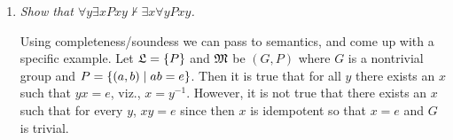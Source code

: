 \documentclass[10pt]{article}
\begin{document}
\begin{enumerate}
\begin{enumerate}
\item \emph{Show that $\forall y \exists x Pxy \not\vdash \exists x \forall y Pxy$.}

Using completeness/soundess we can pass to semantics, and come up with a specific example.  Let $\mathfrak{L}=\left\{ P \right\}$ and $\mathfrak{M}$ be $(G, P)$ where $G$ is a nontrivial group and $P = \left\{ (a,b) \mid ab = e \right\}$.  Then it is true that for all $y$ there exists an $x$ such that $yx = e$, viz., $x = y^{-1}$.  However, it is not true that there exists an $x$ such that for every $y$, $xy = e$ since then $x$ is idempotent so that $x=e$ and $G$ is trivial.
\end{enumerate}

\end{enumerate}
\end{document}
